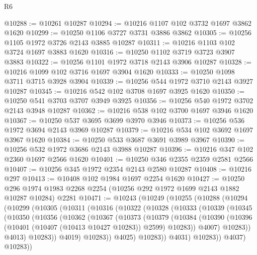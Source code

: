\begin{lexlean}{R6}
\begin{coremodule}
@10288 := @10261 @10287
@10294 := @10216 @1107 @102 @3732 @1697 @3862 @1620
@10299 := @10250 @1106 @3727 @3731 @3886 @3862
@10305 := @10256 @1105 @1972 @3726 @2143 @3885 @10287
@10311 := @10216 @1103 @102 @3724 @1697 @3883 @1620
@10316 := @10250 @1102 @3719 @3723 @3907 @3883
@10322 := @10256 @1101 @1972 @3718 @2143 @3906 @10287
@10328 := @10216 @1099 @102 @3716 @1697 @3904 @1620
@10333 := @10250 @1098 @3711 @3715 @3928 @3904
@10339 := @10256 @544 @1972 @3710 @2143 @3927 @10287
@10345 := @10216 @542 @102 @3708 @1697 @3925 @1620
@10350 := @10250 @541 @3703 @3707 @3949 @3925
@10356 := @10256 @540 @1972 @3702 @2143 @3948 @10287
@10362 := @10216 @538 @102 @3700 @1697 @3946 @1620
@10367 := @10250 @537 @3695 @3699 @3970 @3946
@10373 := @10256 @536 @1972 @3694 @2143 @3969 @10287
@10379 := @10216 @534 @102 @3692 @1697 @3967 @1620
@10384 := @10250 @533 @3687 @3691 @3989 @3967
@10390 := @10256 @532 @1972 @3686 @2143 @3988 @10287
@10396 := @10216 @347 @102 @2360 @1697 @2566 @1620
@10401 := @10250 @346 @2355 @2359 @2581 @2566
@10407 := @10256 @345 @1972 @2354 @2143 @2580 @10287
@10408 := @10216 @297
@10413 := @10408 @102 @1984 @1697 @2254 @1620
@10427 := @10250
    @296
    @1974
    @1983
    @2268
    @2254
    (@10256 @292 @1972 @1699 @2143 @1882 @10287 @10284)
    @2281
@10471 := @10243
    (@10249
      (@10255
        (@10288
          (@10294
            (@10299
              (@10305
                (@10311
                  (@10316
                    (@10322
                      (@10328
                        (@10333
                          (@10339
                            (@10345
                              (@10350
                                (@10356
                                  (@10362
                                    (@10367
                                      (@10373
                                        (@10379
                                          (@10384
                                            (@10390
                                              (@10396
                                                (@10401 (@10407 (@10413 @10427 @10283)) @2599)
                                                @10283))
                                            @4007)
                                          @10283))
                                      @4013)
                                    @10283))
                                @4019)
                              @10283))
                          @4025)
                        @10283))
                    @4031)
                  @10283))
              @4037)
            @10283))

\end{coremodule}
\end{lexlean}
